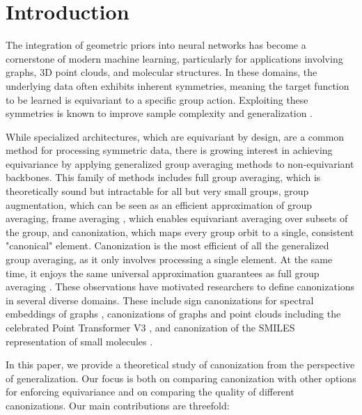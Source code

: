 \documentclass{article}
\theoremstyle{definition}
\theoremstyle{plain}
\begin{document}
\section{Introduction}
The integration of geometric priors into neural networks has become a cornerstone of modern machine learning, particularly for applications involving graphs, 3D point clouds, and molecular structures. In these domains, the underlying data often exhibits inherent symmetries, meaning the target function to be learned is equivariant to a specific group action. Exploiting these symmetries is known to improve sample complexity and generalization \cite{elesedy2021provably,brehmer2025doesequivariancematterscale}.

While specialized architectures, which are equivariant by design, are a common method for processing symmetric data, there is growing interest in achieving equivariance by applying generalized group averaging methods to non-equivariant backbones. This family of methods includes full group averaging, which is theoretically sound but intractable for all but very small groups, group augmentation, which can be seen as an efficient approximation of group averaging, frame averaging \cite{punyframe}, which enables equivariant averaging over subsets of the group, and canonization, which maps every group orbit to a single, consistent "canonical" element. Canonization is the most efficient of all the generalized group averaging, as it only involves processing a single element. At the same time, it enjoys the same universal approximation guarantees as full group averaging \cite{kaba2023equivariance}. These observations have motivated researchers to define canonizations in several diverse domains. These include sign canonizations for spectral embeddings of graphs \cite{ma2023laplacian,ma2024a,hordan2025spectral}, canonizations of graphs \cite{lin2024equivariance} and point clouds \cite{kaba2023equivariance,pmlr-v235-baker24a,friedmann2025,zhou2026rethinkingdiffusionmodelssymmetries} including the celebrated Point Transformer V3 \cite{wu2024ptv3}, and canonization of the SMILES representation of small molecules \cite{canonicalSMILES}.



In this paper, we provide a theoretical study of canonization from the perspective of generalization. Our focus is both on comparing canonization with other options for enforcing equivariance and on comparing the quality of different canonizations. Our main  contributions are threefold:
\end{document}
